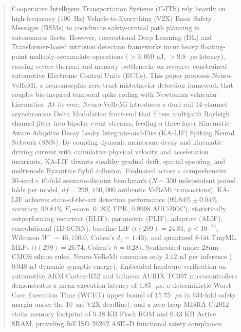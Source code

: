 \documentclass[journal]{IEEEtran}
\begin{document}
\begin{abstract}
Cooperative Intelligent Transportation Systems (C-ITS) rely heavily on high-frequency (100~Hz) Vehicle-to-Everything (V2X) Basic Safety Messages (BSMs) to coordinate safety-critical path planning in autonomous fleets. However, conventional Deep Learning (DL) and Transformer-based intrusion detection frameworks incur heavy floating-point multiply-accumulate operations ($>3{,}000\text{ nJ}$, $>9.8\text{ }\mu\text{s}$ latency), causing severe thermal and memory bottlenecks on resource-constrained automotive Electronic Control Units (ECUs). This paper proposes Neuro-VeReMi, a neuromorphic zero-trust misbehavior detection framework that couples bio-inspired temporal spike coding with Newtonian vehicular kinematics. At its core, Neuro-VeReMi introduces a dual-rail 14-channel asynchronous Delta Modulation front-end that filters multipath Rayleigh channel jitter into bipolar event streams, feeding a three-layer Kinematic-Aware Adaptive Decay Leaky Integrate-and-Fire (KA-LIF) Spiking Neural Network (SNN). By coupling dynamic membrane decay and kinematic driving current with cumulative physical velocity and acceleration invariants, KA-LIF thwarts stealthy gradual drift, spatial spoofing, and multi-node Byzantine Sybil collusion. Evaluated across a comprehensive $30\text{-seed} \times 10\text{-fold}$ scenario-disjoint benchmark ($N=300$ independent paired folds per model, $df=299$, $150{,}000$ authentic VeReMi transactions), KA-LIF achieves state-of-the-art detection performance ($99.84\% \pm 0.04\%$ accuracy, $99.84\%$ $F_1$-score, $0.18\%$ FPR, $0.9998$ AUC-ROC), statistically outperforming recurrent (RLIF), parametric (PLIF), adaptive (ALIF), convolutional (1D-SCNN), baseline LIF ($t(299)=24.81$, $p<10^{-15}$, Wilcoxon $W^+=45{,}150.0$, Cohen's $d_z=1.43$), and quantized 8-bit TinyML MLPs ($t(299)=26.74$, Cohen's $h=0.28$). Synthesized under 28nm CMOS silicon rules, Neuro-VeReMi consumes only $3.12\text{ nJ}$ per inference ($0.048\text{ nJ}$ dynamic synaptic energy). Embedded hardware verification on automotive ARM Cortex-R52 and Infineon AURIX TC397 microcontrollers demonstrates a mean execution latency of $1.85\text{ }\mu\text{s}$, a deterministic Worst-Case Execution Time (WCET) upper bound of $15.75\text{ }\mu\text{s}$ (a 634-fold safety margin under the 10~ms V2X deadline), and a zero-heap MISRA-C:2012 static memory footprint of $5.38\text{ KB}$ Flash ROM and $0.43\text{ KB}$ Active SRAM, providing full ISO 26262 ASIL-D functional safety compliance.
\end{abstract}
\end{document}
